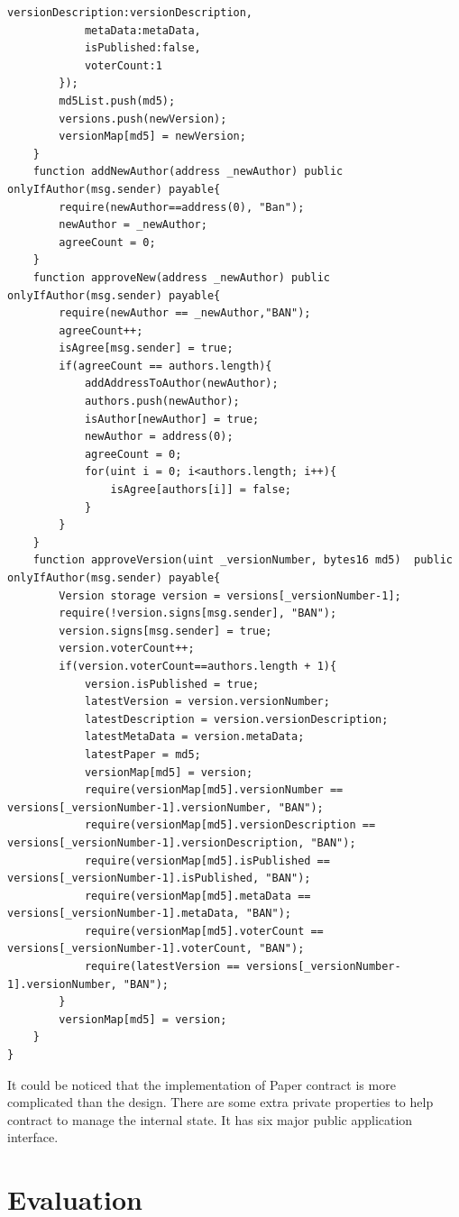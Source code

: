 \documentclass [11pt]{report}
\begin{document}
\begin{lstlisting}[language=Solidity]
            versionDescription:versionDescription,
            metaData:metaData,
            isPublished:false,
            voterCount:1
        });
        md5List.push(md5);
        versions.push(newVersion);
        versionMap[md5] = newVersion;
    }
    function addNewAuthor(address _newAuthor) public onlyIfAuthor(msg.sender) payable{
        require(newAuthor==address(0), "Ban");
        newAuthor = _newAuthor;
        agreeCount = 0;
    }
    function approveNew(address _newAuthor) public onlyIfAuthor(msg.sender) payable{
        require(newAuthor == _newAuthor,"BAN");
        agreeCount++;
        isAgree[msg.sender] = true;
        if(agreeCount == authors.length){
            addAddressToAuthor(newAuthor);
            authors.push(newAuthor);
            isAuthor[newAuthor] = true;
            newAuthor = address(0);
            agreeCount = 0;
            for(uint i = 0; i<authors.length; i++){
                isAgree[authors[i]] = false;
            }
        }
    }
    function approveVersion(uint _versionNumber, bytes16 md5)  public onlyIfAuthor(msg.sender) payable{
        Version storage version = versions[_versionNumber-1];
        require(!version.signs[msg.sender], "BAN");
        version.signs[msg.sender] = true;
        version.voterCount++;
        if(version.voterCount==authors.length + 1){
            version.isPublished = true;
            latestVersion = version.versionNumber;
            latestDescription = version.versionDescription;
            latestMetaData = version.metaData;
            latestPaper = md5;
            versionMap[md5] = version;
            require(versionMap[md5].versionNumber == versions[_versionNumber-1].versionNumber, "BAN");
            require(versionMap[md5].versionDescription == versions[_versionNumber-1].versionDescription, "BAN");
            require(versionMap[md5].isPublished == versions[_versionNumber-1].isPublished, "BAN");
            require(versionMap[md5].metaData == versions[_versionNumber-1].metaData, "BAN");
            require(versionMap[md5].voterCount == versions[_versionNumber-1].voterCount, "BAN");
            require(latestVersion == versions[_versionNumber-1].versionNumber, "BAN");
        }
        versionMap[md5] = version;
    }
} 
\end{lstlisting}
It could be noticed that the implementation of Paper contract is more complicated than the design. 
There are some extra private properties to help contract to manage the internal state. 
It has six major public application interface.
\chapter{Evaluation}
\end{document}
